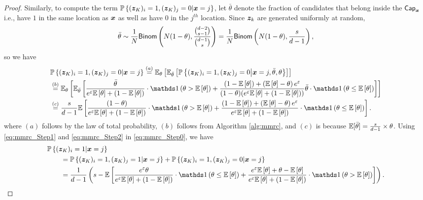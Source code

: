 \begin{proof}
Similarly, to compute the term $\mathbb{P}\left\{ ({\boldsymbol{z}}_K)_i = 1, ({\boldsymbol{z}}_K)_j = 0 | {\boldsymbol{x}} = j \right\}$, let $\bar{\theta}$ denote the fraction of candidates that belong inside the $\mathsf{Cap}_{{\boldsymbol{x}}}$ i.e., have $1$ in the same location as ${\boldsymbol{x}}$ as well as have $0$ in the $j^{th}$ location. Since ${\boldsymbol{z}}_k$ are generated uniformly at random,
$$ \bar{\theta} \sim \frac{1}{N} \mathsf{Binom}\left( N(1-\theta), \frac{\binom{d-2}{s-1}}{\binom{d-1}{s}} \right) = \frac{1}{N} \mathsf{Binom}\left( N(1-\theta), \frac{s}{d-1} \right),$$ so we have
\begin{align}
    & \Pr\lbp (\svbz_K)_i = 1, (\svbz_K)_j = 0 | \svbx = j \rbp 
    \stackrel{(a)}{=} \E_{\theta}\lb \E_{\bar{\theta}}\lb \Pr\lbp (\svbz_K)_i = 1, (\svbz_K)_j = 0 \mv \svbx = j, \bar{\theta}, \theta \rbp \rb\rb \\
    & \stackrel{(b)}{=} \E_{\theta}\lb \E_{\bar{\theta}}\lb \frac{\bar{\theta}}{e^\varepsilon \E\lb \theta \rb + (1-\E\lb \theta \rb)} \cdot \Indicator \lp \theta > \E\lb \theta \rb \rp  + \frac{(1-\E\lb \theta \rb) + \lp \E \lb \theta \rb - \theta \rp e^{\varepsilon}}{(1-\theta) (e^\varepsilon \E\lb \theta \rb + (1-\E\lb \theta \rb))} \bar{\theta} \cdot \Indicator \lp \theta \leq \E\lb \theta \rb \rp  \rb \rb\\ 
    & \stackrel{(c)}{=} \frac{s}{d-1}\E\lb \frac{(1-\theta)}{e^\varepsilon \E\lb \theta \rb + (1-\E\lb \theta \rb)} \cdot \Indicator \lp \theta > \E\lb \theta \rb \rp  + \frac{(1-\E\lb \theta \rb) + \lp \E \lb \theta \rb - \theta \rp e^{\varepsilon}}{e^\varepsilon \E\lb \theta \rb + (1-\E\lb \theta \rb)} \cdot \Indicator \lp \theta \leq \E\lb \theta \rb \rp  \rb. \label{eq:mmrc_Step2}
\end{align}
where $(a)$ follows by the law of total probability, $(b)$ follows 
from Algorithm \ref{alg:mmrc}, and $(c)$ is because $\mathbb{E}[\bar{\theta}] = \frac{s}{d-1} \times \theta$. Using \eqref{eq:mmrc_Step1} and \eqref{eq:mmrc_Step2} in \eqref{eq:mmrc_Step0}, we have
\begin{align}
    & \Pr\lbp (\svbz_K)_i = 1 | \svbx = j \rbp \\
    & \qquad = \Pr\lbp (\svbz_K)_i = 1, (\svbz_K)_j = 1 | \svbx = j \rbp+\Pr\lbp (\svbz_K)_i = 1, (\svbz_K)_j = 0 | \svbx = j \rbp \\
    &\qquad  = \frac{1}{d-1}\lp s - \E\lb \frac{e^\varepsilon \theta}{e^\varepsilon \E\lb \theta \rb + (1-\E \lb \theta \rb)}  \cdot \Indicator \lp \theta \leq \E\lb \theta \rb \rp  + \frac{e^\varepsilon \E \lb \theta \rb + \theta - \E \lb \theta \rb}{e^\varepsilon \E\lb \theta \rb + (1-\E \lb \theta \rb)}  \cdot \Indicator \lp \theta > \E\lb \theta \rb \rp \rb \rp.\label{eq:mmrc_ss_step_2}

\end{align}
\end{proof}

